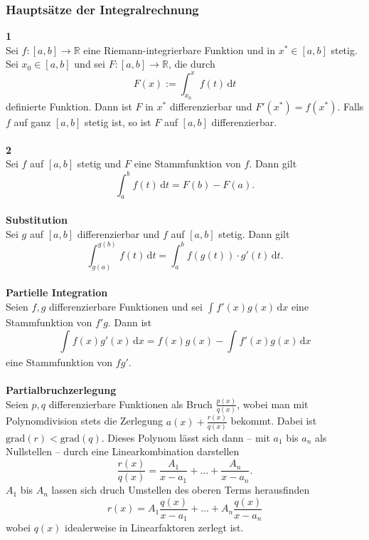 \documentclass[a4paper,12pt]{article}
\newcommand{\td}{\,\text{d}}
\numberwithin{equation}{section}
\begin{document}
\subsubsection{Hauptsätze der Integralrechnung}
\textbf{1}\\ 
Sei $f:[a,b]\rightarrow \mathbb{R}$ eine Riemann-integrierbare Funktion und in $x^* \in [a,b]$ stetig. Sei $x_0 \in [a,b]$ und sei $F:[a,b]\rightarrow \mathbb{R}$, die durch
\[ 
        F\left(x\right):=\int_{x_0}^{x}f\left(t\right)\td t
\] 
definierte Funktion. Dann ist $F$ in $x^*$ differenzierbar und $F'\left(x^*\right)=f\left(x^*\right)$. Falls $f$ auf ganz $[a,b]$ stetig ist, so ist $F$ auf $[a,b]$ differenzierbar.
\\\hfill\\\textbf{2}\\ 
Sei $f$ auf $[a,b]$ stetig und $F$ eine Stammfunktion von $f$. Dann gilt
\[ 
        \int_{a}^{b}f\left(t\right)\td t=F\left(b\right)-F\left(a\right)
.\] 
\hfill\\\textbf{Substitution}\\ 
Sei $g$ auf $[a,b]$ differenzierbar und $f$ auf $[a,b]$ stetig. Dann gilt
\[ 
        \int_{g\left(a\right)}^{g\left(b\right)}f\left(t\right)\td t=\int_{a}^{b}f\left(g\left(t\right)\right)\cdot g'\left(t\right)\td t
.\] 
\hfill\\\textbf{Partielle Integration}\\ 
Seien $f,g$ differenzierbare Funktionen und sei $\int_{}^{}f'\left(x\right)g\left(x\right)\td x$ eine Stammfunktion von $f'g$. Dann ist
\[ 
        \int_{}^{}f\left(x\right)g'\left(x\right)\td x=f\left(x\right)g\left(x\right)-\int_{}^{}f'\left(x\right)g\left(x\right)\td x
\] 
eine Stammfunktion von $fg'$.
\\\hfill\\\textbf{Partialbruchzerlegung}\\ 
Seien $p,q$ differenzierbare Funktionen als Bruch $\tfrac{p\left(x\right)}{q\left(x\right)}$, wobei man mit Polynomdivision stets die Zerlegung $a\left(x\right)+\tfrac{r\left(x\right)}{q\left(x\right)}$ bekommt. Dabei ist $\text{grad}\left(r\right)<\text{grad}\left(q\right)$. Dieses Polynom lässt sich dann -- mit $a_1$ bis $a_n$ als Nullstellen -- durch eine Linearkombination darstellen
\[ 
        \dfrac{r\left(x\right)}{q\left(x\right)}=\dfrac{A_1}{x-a_1}+\hdots +\dfrac{A_n}{x-a_n}
.\] 
$A_1$ bis $A_n$ lassen sich druch Umstellen des oberen Terms herausfinden
\[ 
        r\left(x\right)=A_1\dfrac{q\left(x\right)}{x-a_1}+\hdots +A_n\dfrac{q\left(x\right)}{x-a_n}
\] 
wobei $q\left(x\right)$ idealerweise in Linearfaktoren zerlegt ist.\\
\end{document}
